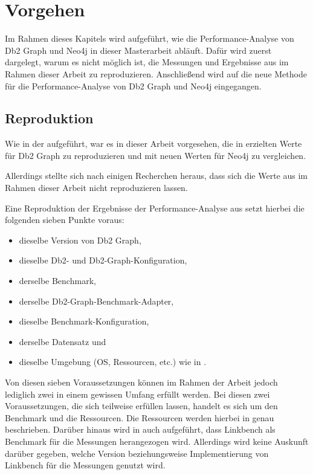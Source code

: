 \chapter{Vorgehen}
\label{vorgehen}
Im Rahmen dieses Kapitels wird aufgeführt, wie die Performance-Analyse von Db2 Graph und Neo4j in dieser Masterarbeit abläuft. Dafür wird zuerst dargelegt, warum es nicht möglich ist, die Messungen und Ergebnisse aus \cite{sigmod_tian} im Rahmen dieser Arbeit zu reproduzieren. Anschließend wird auf die neue Methode für die Performance-Analyse von Db2 Graph und Neo4j eingegangen. 

\section{Reproduktion}
\label{analyse:reproduktion}
Wie in der  aufgeführt, war es in dieser Arbeit vorgesehen, die in \cite{sigmod_tian} erzielten Werte für Db2 Graph zu reproduzieren und mit neuen Werten für Neo4j zu vergleichen. 

Allerdings stellte sich nach einigen Recherchen heraus, dass sich die Werte aus \cite{sigmod_tian} im Rahmen dieser Arbeit nicht reproduzieren lassen. 

Eine Reproduktion der Ergebnisse der Performance-Analyse aus \cite{sigmod_tian} setzt hierbei die folgenden sieben Punkte voraus:
\begin{itemize}
    \item dieselbe Version von Db2 Graph,
    \item dieselbe Db2- und Db2-Graph-Konfiguration,
    \item derselbe Benchmark,
    \item derselbe Db2-Graph-Benchmark-Adapter,
    \item dieselbe Benchmark-Konfiguration,
    \item derselbe Datensatz und 
    \item dieselbe Umgebung (OS, Ressourcen, etc.) wie in \cite{sigmod_tian}.
\end{itemize}
Von diesen sieben Voraussetzungen können im Rahmen der Arbeit jedoch lediglich zwei in einem gewissen Umfang erfüllt werden. Bei diesen zwei Voraussetzungen, die sich teilweise erfüllen lassen, handelt es sich um den Benchmark und die Ressourcen. Die Ressourcen werden hierbei in \cite{sigmod_tian} genau beschrieben. Darüber hinaus wird in \cite{sigmod_tian} auch aufgeführt, dass Linkbench als Benchmark für die Messungen herangezogen wird. Allerdings wird keine Auskunft darüber gegeben, welche Version beziehungsweise Implementierung von Linkbench für die Messungen genutzt wird.

